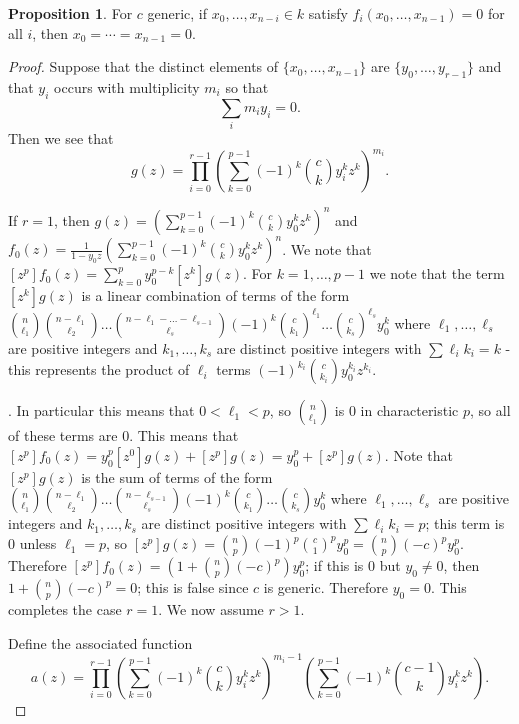 \documentclass{amsart}
\theoremstyle{definition}
\newtheorem{prop}[thm]{Proposition}
\begin{document}
\begin{prop} 
For $c$ generic, if $x_0, \ldots, x_{n - i} \in k$ satisfy $f_i(x_0, \ldots, x_{n - 1}) = 0$ for all $i$, then $x_0 = \cdots = x_{n - 1} = 0$.
\end{prop}
\begin{proof}
Suppose that the distinct elements of $\{x_0, \ldots, x_{n - 1}\}$ are $\{y_0, \ldots, y_{r - 1}\}$ and that $y_i$ occurs with multiplicity $m_i$ so that 
\[
\sum_i m_i y_i = 0.
\]
Then we see that 
\[
g(z) = \prod_{i = 0}^{r - 1} \left(\sum_{k = 0}^{p - 1} (-1)^k\binom{c}{k} y_i^k z^k\right)^{m_i}.
\]

If $r=1$, then $g(z)= \left(\sum_{k=0}^{p-1} (-1)^k \binom{c}{k} y_0^kz^k\right)^n$ and $f_0(z)=\frac{1}{1-y_0z}\left(\sum_{k=0}^{p-1} (-1)^k \binom{c}{k} y_0^kz^k\right)^n$. We note that $[z^p]f_0(z)=\sum_{k=0}^p y_0^{p-k}[z^k]g(z)$. For $k=1,\dots,p-1$ we note that the term $[z^k]g(z)$ is a linear combination of terms of the form $\binom{n}{\ell_1}\binom{n-\ell_1}{\ell_2}\dots\binom{n-\ell_1-\dots-\ell_{s-1}}{\ell_s}(-1)^k\binom{c}{k_1}^{\ell_1}\dots\binom{c}{k_s}^{\ell_s}y_0^k$ where $\ell_1,\dots,\ell_s$ are positive integers and $k_1,\dots,k_s$ are distinct positive integers with $\sum \ell_ik_i=k$ - this represents the product of $\ell_i$ terms $ (-1)^{k_i}\binom{c}{k_i} y_0^{k_i} z^{k_i}$. 


. In particular this means that $0 < \ell_1 < p$, so $\binom{n}{\ell_1}$ is $0$ in characteristic $p$, so all of these terms are $0$. This means that $[z^p]f_0(z)=y_0^p[z^0]g(z)+[z^p]g(z)=y_0^p+[z^p]g(z)$. Note that $[z^p]g(z)$ is the sum of terms of the form $\binom{n}{\ell_1}\binom{n-\ell_1}{\ell_2}\dots\binom{n-\ell_{s-1}}{\ell_s}(-1)^k\binom{c}{k_1}\dots\binom{c}{k_s}y_0^k$ where $\ell_1,\dots,\ell_s$ are positive integers and $k_1,\dots,k_s$ are distinct positive integers with $\sum \ell_ik_i=p$; this term is $0$ unless $\ell_1=p$, so $[z^p]g(z)=\binom{n}{p}(-1)^p\binom{c}{1}^py_0^p=\binom{n}{p}(-c)^py_0^p$. Therefore $[z^p]f_0(z)=\left(1+\binom{n}{p}(-c)^p\right)y_0^p$; if this is $0$ but $y_0 \ne 0$, then $1+\binom{n}{p}(-c)^p=0$; this is false since $c$ is generic. Therefore $y_0=0$. This completes the case $r=1$. We now assume $r>1$.


Define the associated function
\[
a(z) = \prod_{i = 0}^{r - 1} \left(\sum_{k = 0}^{p - 1} (-1)^k\binom{c}{k} y_i^k z^k\right)^{m_i - 1}\left(\sum_{k = 0}^{p - 1} (-1)^k\binom{c - 1}{k} y_i^k z^k\right).
\]






\end{proof}
\end{document}
